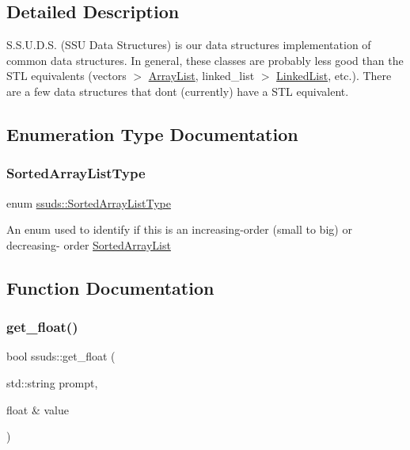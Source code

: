 \subsection{Detailed Description}
S.\+S.\+U.\+D.\+S. (S\+SU Data Structures) is our data structures implementation of common data structures. In general, these classes are probably less good than the S\+TL equivalents (vectors $>$ \mbox{\hyperlink{classssuds_1_1_array_list}{Array\+List}}, linked\+\_\+list $>$ \mbox{\hyperlink{classssuds_1_1_linked_list}{Linked\+List}}, etc.). There are a few data structures that don\textquotesingle{}t (currently) have a S\+TL equivalent. 

\subsection{Enumeration Type Documentation}
\mbox{\label{namespacessuds_a21d5ba2a8737547c6ec7c450072498e1}} 
\subsubsection{\texorpdfstring{SortedArrayListType}{SortedArrayListType}}
{\footnotesize\ttfamily enum \mbox{\hyperlink{namespacessuds_a21d5ba2a8737547c6ec7c450072498e1}{ssuds\+::\+Sorted\+Array\+List\+Type}}\hspace{0.3cm}{\ttfamily [strong]}}

An enum used to identify if this is an increasing-\/order (small to big) or decreasing-\/ order \mbox{\hyperlink{classssuds_1_1_sorted_array_list}{Sorted\+Array\+List}} 

\subsection{Function Documentation}
\mbox{\label{namespacessuds_a0edcd5330a83846b934e542639e1d7a6}} 
\subsubsection{\texorpdfstring{get\_float()}{get\_float()}}
{\footnotesize\ttfamily bool ssuds\+::get\+\_\+float (\begin{DoxyParamCaption}\item[{std\+::string}]{prompt,  }\item[{float \&}]{value }\end{DoxyParamCaption})}

